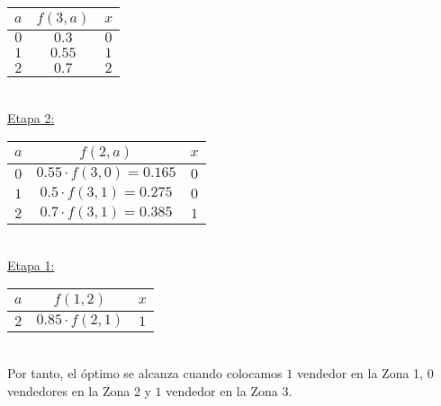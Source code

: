 \documentclass[MIOP.tex]{subfiles}
\begin{document}
\begin{tabular}{|c| c| c| }
\hline
$a$ & $f(3,a)$ & $x$ \\
\hline
$0$ & $0.3$ & $0$\\
\hline
$1$ & $0.55$ & $1$\\
\hline
$2$ & $0.7$ & $2$\\
\hline
\end{tabular}\\

\underline{Etapa 2:}\

\begin{tabular}{|c| c| c| }
\hline
$a$ & $f(2,a)$ & $x$ \\
\hline
$0$ & $0.55\cdot f(3,0) = 0.165$  & $0$\\
\hline
$1$ & $0.5\cdot f(3,1) = 0.275 $ & $0$\\
\hline
$2$ & $0.7\cdot f(3,1) = 0.385$ & $1$\\
\hline
\end{tabular}\\

\underline{Etapa 1:}\

\begin{tabular}{|c| c| c| }
\hline
$a$ & $f(1,2)$ & $x$ \\
\hline
$2$ & $0.85\cdot f(2,1)$ & $1$\\
\hline
\end{tabular}\\
Por tanto, el óptimo se alcanza cuando colocamos $1$ vendedor en la Zona 1, $0$ vendedores en la Zona 2 y $1$ vendedor en la Zona 3.
\end{document}

